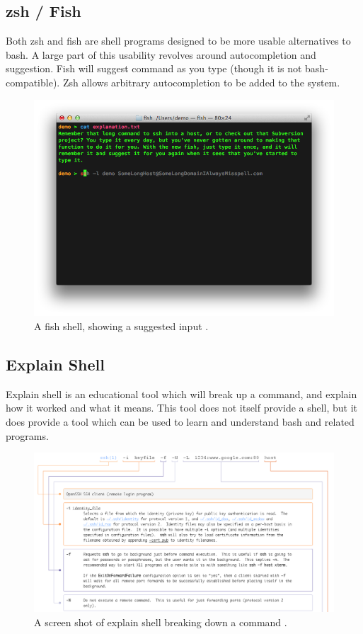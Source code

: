 \subsection{zsh / Fish}
Both zsh and fish are shell programs designed to be more usable alternatives to
bash. A large part of this usability revolves around autocompletion and
suggestion. Fish will suggest command as you type (though it is not
bash-compatible). Zsh allows arbitrary autocompletion to be added to the system.
\begin{figure}[H]
  \centering
  \includegraphics[width=0.8\linewidth]{figures/existing/fish.png}
  \caption{A fish shell, showing a suggested input \cite{fishshell}.}
  \label{fig:fish}
\end{figure}

\subsection{Explain Shell}
Explain shell is an educational tool which will break up a command, and explain
how it worked and what it means. This tool does not itself provide a shell, but
it does provide a tool which can be used to learn and understand bash and
related programs.
\begin{figure}[H]
  \centering
  \includegraphics[width=0.8\linewidth]{figures/existing/eplainshell.png}
  \caption{A screen shot of explain shell breaking down a command \cite{explainshell}.}
  \label{fig:explainsh}
\end{figure}

